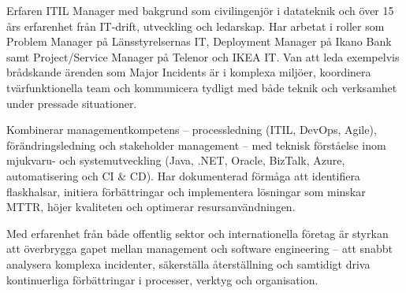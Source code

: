 Erfaren ITIL Manager med bakgrund som civilingenjör i datateknik och över 15 års erfarenhet från IT-drift, utveckling och ledarskap. Har arbetat i roller som Problem Manager på Länsstyrelsernas IT, Deployment Manager på Ikano Bank samt Project/Service Manager på Telenor och IKEA IT. Van att leda exempelvis brådskande ärenden som Major Incidents är i komplexa miljöer, koordinera tvärfunktionella team och kommunicera tydligt med både teknik och verksamhet under pressade situationer.

Kombinerar managementkompetens – processledning (ITIL, DevOps, Agile), förändringsledning och stakeholder management – med teknisk förståelse inom mjukvaru- och systemutveckling (Java, .NET, Oracle, BizTalk, Azure, automatisering och CI & CD). Har dokumenterad förmåga att identifiera flaskhalsar, initiera förbättringar och implementera lösningar som minskar MTTR, höjer kvaliteten och optimerar resursanvändningen.

Med erfarenhet från både offentlig sektor och internationella företag är styrkan att överbrygga gapet mellan management och software engineering – att snabbt analysera komplexa incidenter, säkerställa återställning och samtidigt driva kontinuerliga förbättringar i processer, verktyg och organisation.